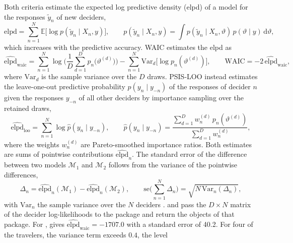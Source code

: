 \documentclass[article,shortnames]{jss}
\newcommand{\fct}[1]{\code{#1()}}
\begin{document}
Both criteria estimate the expected log predictive density (elpd) of a model for
the responses $\tilde{y}_n$ of new deciders,
%
\begin{equation}
\label{eq:elpd}
\mathrm{elpd} = \sum_{n = 1}^{N} \mathbb{E}\big[\log p(\tilde{y}_n \mid X_n,
y)\big], \qquad
p(\tilde{y}_n \mid X_n, y) = \int p(\tilde{y}_n \mid X_n, \vartheta)\,
p(\vartheta \mid y)\, \mathrm{d}\vartheta,
\end{equation}
%
which increases with the predictive accuracy. WAIC estimates the elpd as
%
\begin{equation}
\label{eq:waic}
\widehat{\mathrm{elpd}}_{\mathrm{waic}} = \sum_{n = 1}^{N} \log \bigg(
\frac{1}{D} \sum_{d = 1}^{D} p_n\big(\vartheta^{(d)}\big) \bigg) - \sum_{n =
1}^{N} \mathrm{Var}_d\big[\log p_n(\vartheta^{(d)})\big], \qquad
\mathrm{WAIC} = -2\, \widehat{\mathrm{elpd}}_{\mathrm{waic}},
\end{equation}
%
where $\mathrm{Var}_d$ is the sample variance over the $D$ draws. PSIS-LOO
instead estimates the leave-one-out predictive probability $p(y_n \mid y_{-n})$
of the responses of decider $n$ given the responses $y_{-n}$ of all other
deciders by importance sampling over the retained draws,
%
\begin{equation}
\label{eq:psis_loo}
\widehat{\mathrm{elpd}}_{\mathrm{loo}} = \sum_{n = 1}^{N} \log \hat{p}(y_n \mid
y_{-n}), \qquad
\hat{p}(y_n \mid y_{-n}) = \frac{\sum_{d = 1}^{D} w_n^{(d)}\,
p_n(\vartheta^{(d)})}{\sum_{d = 1}^{D} w_n^{(d)}},
\end{equation}
%
where the weights $w_n^{(d)}$ are Pareto-smoothed importance ratios. Both
estimates are sums of pointwise contributions $\widehat{\mathrm{elpd}}_n$. The
standard error of the difference between two models $\mathcal{M}_1$ and
$\mathcal{M}_2$ follows from the variance of the pointwise differences,
%
\begin{equation}
\label{eq:elpd_difference}
\Delta_n = \widehat{\mathrm{elpd}}_{n}(\mathcal{M}_1) -
\widehat{\mathrm{elpd}}_{n}(\mathcal{M}_2),
\qquad
\mathrm{se}\Big(\sum_{n = 1}^{N} \Delta_n\Big) = \sqrt{N\,
\mathrm{Var}_n(\Delta_n)},
\end{equation}
%
with $\mathrm{Var}_n$ the sample variance over the $N$ deciders
\citep{Vehtari2017}. \fct{WAIC} and \fct{loo} pass the $D \times N$ matrix of
the decider log-likelihoods to the  package and return the objects of
that package. For , \fct{WAIC} gives
$\widehat{\mathrm{elpd}}_{\mathrm{waic}} = -1707.0$ with a standard error of
40.2. For four of the travelers, the variance term exceeds $0.4$, the level
\end{document}
